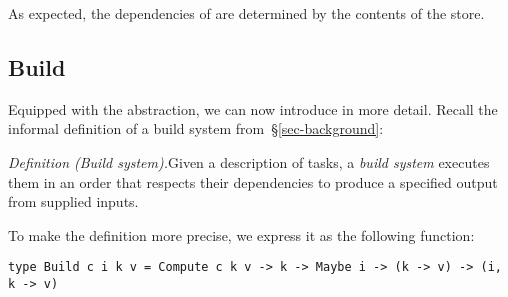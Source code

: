 \noindent
As expected, the dependencies of  are determined by the contents of
the store.







\subsection{Build}\label{sec-general-build}

Equipped with the  abstraction, we can now introduce  in
more detail. Recall the informal definition of a build system
from~\S\ref{sec-background}:

\vspace{2mm}
\emph{Definition (Build system).}\hspace{1.5mm}Given a description of tasks, a
\emph{build system} executes them in an order that respects their dependencies
to produce a specified output from supplied inputs.
\vspace{2mm}

\noindent
To make the definition more precise, we express it as the following function:

\vspace{1mm}
\begin{verbatim}
type Build c i k v = Compute c k v -> k -> Maybe i -> (k -> v) -> (i, k -> v)
\end{verbatim}
\vspace{1mm}

